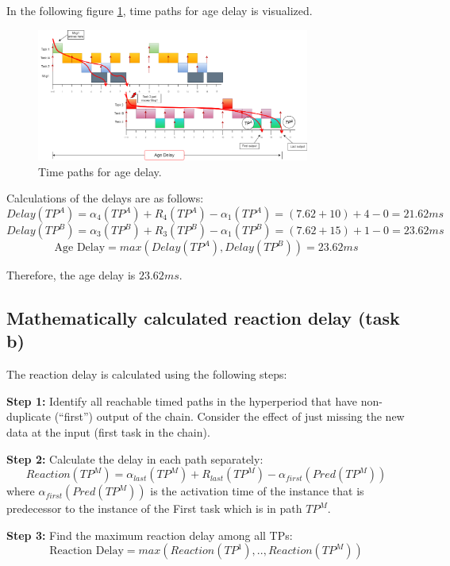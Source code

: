             In the following figure \ref{fig:agedelaypaths}, time paths for age delay is visualized.

            \begin{figure}[H]
                \centering
                \includegraphics[width=0.8\textwidth]{images/TimedPathAgeDelay.png}
                \caption{Time paths for age delay.}
                \label{fig:agedelaypaths}  
            \end{figure}

            Calculations of the delays are as follows:
            $$Delay(TP^A) = \alpha_4(TP^A) + R_4(TP^A) - \alpha_1(TP^A) = (7.62+10) + 4 - 0 = 21.62ms$$
            $$Delay(TP^B) = \alpha_3(TP^B) + R_3(TP^B) - \alpha_1(TP^B) = (7.62+15) + 1 - 0 = 23.62ms$$
            $$\text{Age Delay} = max(Delay(TP^A), Delay(TP^B)) = 23.62ms$$

            Therefore, the age delay is $23.62ms$.

        \subsection*{\textbf{Mathematically calculated reaction delay (task b)}}
            The reaction delay is calculated using the following steps:

            \textbf{Step 1:} Identify all reachable timed paths in the hyperperiod that have non-duplicate (“first”) output of the chain. Consider the effect of just missing the new data at the input (first task in the chain).

            \textbf{Step 2:} Calculate the delay in each path separately:
            $$Reaction(TP^M) = \alpha_{last}(TP^M) + R_{last}(TP^M) - \alpha_{first}(Pred(TP^M))$$
            where $\alpha_{first}(Pred(TP^M))$ is the activation time of the instance that is predecessor to the instance of the First task
            which is in path $TP^M$.

            \textbf{Step 3:} Find the maximum reaction delay among all TPs: 
            $$\text{Reaction Delay} = max(Reaction(TP^1),..,Reaction(TP^M))$$

